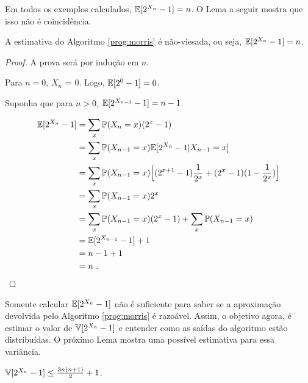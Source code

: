Em todos os exemplos calculados, $\mathbb{E}[2^{X_n} - 1] = n$. O Lema a seguir mostra que isso não é coincidência.


\begin{lemma} \label{morris:expected_value}
A estimativa do Algoritmo \ref{prog:morris} é não-viesada, ou seja, $\mathbb{E}[2^{X_n} - 1] = n$.
\end{lemma}

\begin{proof}
A prova será por indução em $n$. 

Para $n = 0$, $X_n$ = 0. Logo, $\mathbb{E}[2^0 - 1] = 0$.

Suponha que para $n > 0$, $\mathbb{E}[2^{X_{n-1}} - 1] = n-1$.

\begin{align*}
  \mathbb{E}[2^{X_n} - 1] 
    &= \sum_{x} \mathbb{P} (X_n = x) (2^x - 1) \\
    &= \sum_{x} \mathbb{P} (X_{n-1} = x) \mathbb{E}[2^{X_n} - 1 | X_{n-1} = x] \\
    &= \sum_{x} \mathbb{P} (X_{n-1} = x) \Big[ (2^{x+1} - 1) \frac{1}{2^x} +  (2^x - 1) (1 - \frac{1}{2^x}) \Big] \\
    &= \sum_{x} \mathbb{P} (X_{n-1} = x) 2^x \\
    &= \sum_{x} \mathbb{P} (X_{n-1} = x) (2^x - 1) + \sum_{x} \mathbb{P} (X_{n-1} = x) \\
    &= \mathbb{E}[2^{X_{n-1}} - 1] + 1 \\
    &= n - 1 + 1 \\
    &= n \ .
\end{align*}

\end{proof}

Somente calcular $\mathbb{E}[2^{X_n} - 1]$ não é suficiente para saber se a aproximação devolvida pelo Algoritmo \ref{prog:morris} é razoável.
Assim, o objetivo agora, é estimar o valor de $\mathbb{V}[2^{X_n} - 1]$ e entender como as saídas do algoritmo estão distribuídas. 
O próximo Lema mostra uma possível estimativa para essa variância.

\begin{lemma} \label{morris:variance}
$\mathbb{V}[2^{X_n} - 1] \leq \frac{3n(n+1)}{2} + 1$.
\end{lemma}

